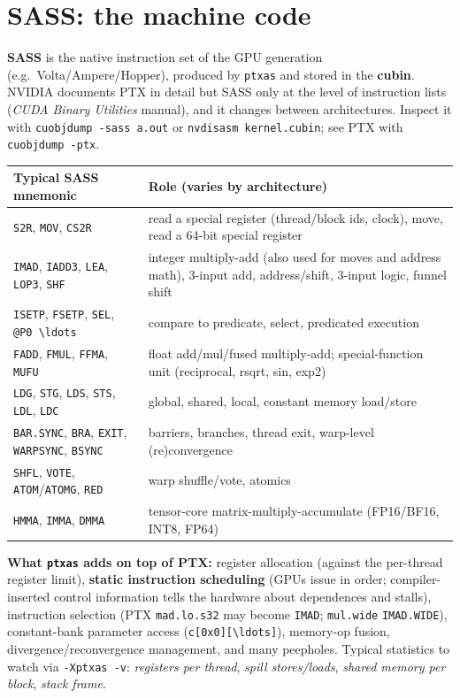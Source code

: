 \documentclass[10pt,a4paper,openany,oneside]{report}
\newcommand{\prio}[1]{\texorpdfstring{\ifcase#1\or{\color{gold}\ding{72}}\or{\color{gold}\ding{72}\ding{72}}\or{\color{gold}\ding{72}\ding{72}\ding{72}}\fi}{}}
\begin{document}
\section{SASS: the machine code \prio{2}}
\textbf{SASS} is the native instruction set of the GPU generation (e.g.\ Volta/Ampere/Hopper), produced by \texttt{ptxas} and stored in the \textbf{cubin}. NVIDIA documents PTX in detail but SASS only at the level of instruction lists (\emph{CUDA Binary Utilities} manual), and it changes between architectures. Inspect it with \texttt{cuobjdump -sass a.out} or \texttt{nvdisasm kernel.cubin}; see PTX with \texttt{cuobjdump -ptx}.
\begin{center}\small
\begin{xltabular}{\textwidth}{@{}L{3.2cm}Y@{}}
\toprule
\textbf{Typical SASS mnemonic} & \textbf{Role (varies by architecture)}\\
\midrule\endhead
\texttt{S2R}, \texttt{MOV}, \texttt{CS2R} & read a special register (thread/block ids, clock), move, read a 64-bit special register\\
\texttt{IMAD}, \texttt{IADD3}, \texttt{LEA}, \texttt{LOP3}, \texttt{SHF} & integer multiply-add (also used for moves and address math), 3-input add, address/shift, 3-input logic, funnel shift\\
\texttt{ISETP}, \texttt{FSETP}, \texttt{SEL}, \texttt{@P0 \textbackslash{}ldots} & compare to predicate, select, predicated execution\\
\texttt{FADD}, \texttt{FMUL}, \texttt{FFMA}, \texttt{MUFU} & float add/mul/fused multiply-add; special-function unit (reciprocal, rsqrt, sin, exp2)\\
\texttt{LDG}, \texttt{STG}, \texttt{LDS}, \texttt{STS}, \texttt{LDL}, \texttt{LDC} & global, shared, local, constant memory load/store\\
\texttt{BAR.SYNC}, \texttt{BRA}, \texttt{EXIT}, \texttt{WARPSYNC}, \texttt{BSYNC} & barriers, branches, thread exit, warp-level (re)convergence\\
\texttt{SHFL}, \texttt{VOTE}, \texttt{ATOM}/\texttt{ATOMG}, \texttt{RED} & warp shuffle/vote, atomics\\
\texttt{HMMA}, \texttt{IMMA}, \texttt{DMMA} & tensor-core matrix-multiply-accumulate (FP16/BF16, INT8, FP64)\\
\bottomrule
\end{xltabular}
\end{center}
\textbf{What \texttt{ptxas} adds on top of PTX:} register allocation (against the per-thread register limit), \textbf{static instruction scheduling} (GPUs issue in order; compiler-inserted control information tells the hardware about dependences and stalls), instruction selection (PTX \texttt{mad.lo.s32} may become \texttt{IMAD}; \texttt{mul.wide} \texttt{IMAD.WIDE}), constant-bank parameter access (\texttt{c[0x0][\textbackslash{}ldots]}), memory-op fusion, divergence/reconvergence management, and many peepholes. Typical statistics to watch via \texttt{-Xptxas -v}: \emph{registers per thread}, \emph{spill stores/loads}, \emph{shared memory per block}, \emph{stack frame}.
\end{document}
